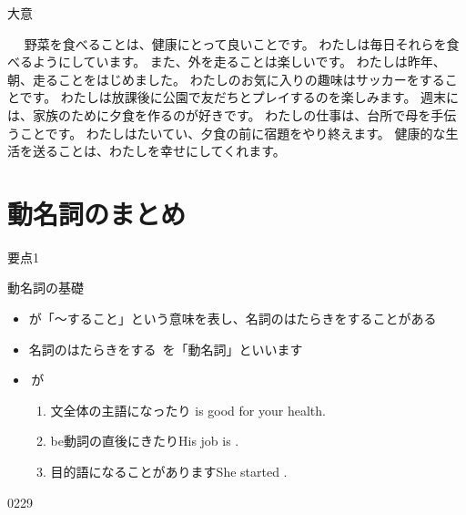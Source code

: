 \documentclass[aspectratio=169,xcolor={dvipsnames,table}]{beamer}
\begin{document}
\begin{frame}[plain]{大意}
 
\begin{tcolorbox}
　 野菜を食べることは、健康にとって良いことです。
わたしは毎日それらを食べるようにしています。
また、外を走ることは楽しいです。
わたしは昨年、朝、走ることをはじめました。
わたしのお気に入りの趣味はサッカーをすることです。
わたしは放課後に公園で友だちとプレイするのを楽しみます。
週末には、家族のために夕食を作るのが好きです。
わたしの仕事は、台所で母を手伝うことです。
わたしはたいてい、夕食の前に宿題をやり終えます。
健康的な生活を送ることは、わたしを幸せにしてくれます。
\end{tcolorbox}
\end{frame}
\section{動名詞のまとめ}
\begin{frame}[plain]{要点1}

\begin{block}{動名詞の基礎}
\begin{itemize}[square]\small
 \item<2->    が「～すること」という意味を表し、名詞のはたらきをすることがある%
 \item<3-> 名詞のはたらきをする \,を「動名詞」といいます
 \item<4-> \,が
      \begin{enumerate}[circle]\small
       \item<5-> 文全体の主語になったり\hfill{\scriptsize {} is good for your health.}\\
\hfill{}
       \item<6-> be動詞の直後にきたり\hfill{\scriptsize His job is .}\\
\hfill{}
       \item<7-> 目的語になることがあります\hfill{\scriptsize She started }.\\
\hfill{}
      \end{enumerate}
 \end{itemize}
     \end{block}
\hfill{}

\hfill{\tiny 0229}\,{\scriptsize {}}

\end{frame}
\end{document}
